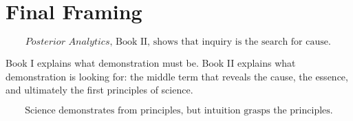 \documentclass[12pt]{article}
\begin{document}
\section*{Final Framing}

\[
\boxed{
\textit{Posterior Analytics}, \text{ Book II, shows that inquiry is the search for cause.}
}
\]

Book I explains what demonstration must be. Book II explains what demonstration
is looking for: the middle term that reveals the cause, the essence, and
ultimately the first principles of science.

\[
\boxed{
\text{Science demonstrates from principles, but intuition grasps the principles.}
}
\]
\end{document}
